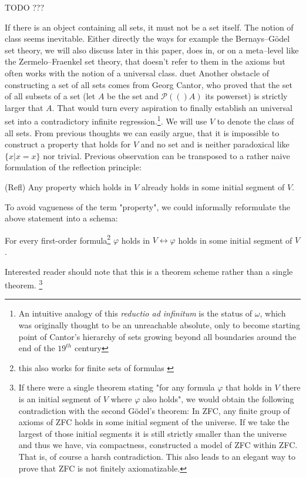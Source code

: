\documentclass[12pt,a4paper]{article}
\newcommand{\power}[1]{\ensuremath{\mathscr{P}} (#1)}
\renewcommand{\iff}{\leftrightarrow}
\begin{document}
TODO ???

If there is an object containing all sets, it must not be a set itself. The notion of class seems inevitable. Either directly the ways for example the Bernays–Gödel set theory, we will also discuss later in this paper, does in, or on a meta–level like the Zermelo–Fraenkel set theory, that doesn't refer to them in the axioms but often works with the notion of a universal class.
duet
Another obstacle of constructing a set of all sets comes from Georg Cantor, who proved that the set of all subsets of a set (let $A$ be the set and $\power (A)$ its powerset) is strictly larger that $A$. That would turn every aspiration to finally establish an universal set into a contradictory infinite regression.\footnote{An intuitive analogy of this \emph{reductio ad infinitum} is the status of $\omega$, which was originally thought to be an unreachable absolute, only to become starting point of Cantor's hierarchy of sets growing beyond all boundaries around the end of the $19^{th}$ century}. We will use $V$ to denote the class of all sets. %
\newpage
From previous thoughts we can easily argue, that it is impossible to construct a property that holds for $V$ and no set and is neither paradoxical like $\{x  |  x = x\}$ nor trivial. Previous observation can be transposed to a rather naive formulation of the reflection principle:


\medskip

(Refl) Any property which holds in $V$ already holds in some initial segment of $V$. 

\medskip

To avoid vagueness of the term "property", we could informally reformulate the above statement into a schema: 

\medskip

For every first-order formula\footnote{this also works for finite sets of formulas \cite[p.~168]{JechBook}} $\varphi$ holds in $V \iff \varphi$ holds in some initial segment of $V$.

\medskip 

Interested reader should note that this is a theorem scheme rather than a single theorem. \footnote{If there were a single theorem stating "for any formula $\varphi$ that holds in $V$ there is an initial segment of $V$ where $\varphi$ also holds", we would obtain the following contradiction with the second G{\"o}del's theorem: In ZFC, any finite group of axioms of ZFC holds in some initial segment of the universe. If we take the largest of those initial segments it is still strictly smaller than the universe and thus we have, via compactness, constructed a model of ZFC within ZFC. That is, of course a harsh contradiction. This also leads to an elegant way to prove that ZFC is not finitely axiomatizable.}
\end{document}
